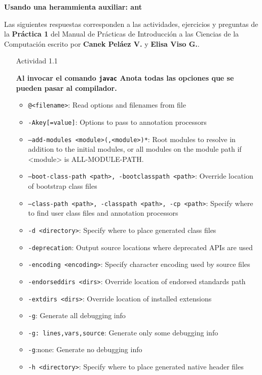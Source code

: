 \documentclass[11pt,letterpaper]{article}
\begin{document}
{\Large \bfseries Usando una herammienta auxiliar: ant \par}

Las siguientes respuestas corresponden a las actividades, ejercicios y preguntas
de la \textbf{Práctica 1} del Manual de Prácticas de Introducción a las Ciencias
de la Computación escrito por \textbf{Canek Peláez V.} y \textbf{Elisa Viso G.}.

\begin{enumerate}
    \item [Actividad 1.1] {\bfseries Al invocar el comando \texttt{javac} Anota todas las opciones que se pueden pasar al compilador. \par}
        \begin{itemize}
            \item \texttt{@<filename>}: Read options and filenames from file
            \item \texttt{-Akey[=value]}: Options to pass to annotation processors
            \item \texttt{--add-modules <module>(,<module>)*}: Root modules to resolve in addition to the initial modules, or all modules on the module path if <module> is ALL-MODULE-PATH.
            \item \texttt{--boot-class-path <path>, -bootclasspath <path>}: Override location of bootstrap class files
            \item \texttt{--class-path <path>, -classpath <path>, -cp <path>}: Specify where to find user class files and annotation processors
            \item \texttt{-d <directory>}: Specify where to place generated class files
            \item \texttt{-deprecation}: Output source locations where deprecated APIs are used
            \item \texttt{-encoding <encoding>}: Specify character encoding used by source files
            \item \texttt{-endorseddirs <dirs>}: Override location of endorsed standards path
            \item \texttt{-extdirs <dirs>}: Override location of installed extensions
            \item \texttt{-g}: Generate all debugging info
            \item \texttt{-g: lines,vars,source}: Generate only some debugging info
            \item \texttt{-g}:none: Generate no debugging info
            \item \texttt{-h <directory>}: Specify where to place generated native header files

\end{itemize}
\end{enumerate}
\end{document}
